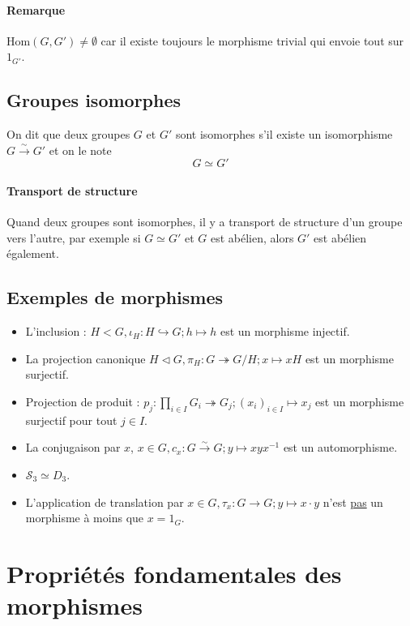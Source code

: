\documentclass[a4paper,10pt]{report}
\newcommand{\inj}{\hookrightarrow}
\newcommand{\surj}{\twoheadrightarrow}
\newcommand{\bij}{\overset{\sim}{\to}} %
\begin{document}
    \paragraph{Remarque}
    $\text{Hom}(G,G') \neq \emptyset$ car il existe toujours le morphisme trivial
    qui envoie tout sur $1_{G'}$.

   \subsection{Groupes isomorphes}
    On dit que deux groupes $G$ et $G'$ sont isomorphes s'il existe un
    isomorphisme $G \bij G'$ et on le note $$G \simeq G'$$

    \paragraph{Transport de structure} Quand deux groupes sont isomorphes,
    il y a transport de structure d'un groupe vers l'autre, par exemple si
    $G \simeq G'$ et $G$ est abélien, alors $G'$ est abélien également.

   \subsection{Exemples de morphismes}
    \begin{itemize}
     \item L'inclusion : $H < G, \iota_H : H \inj G; h \mapsto h$ est
       un morphisme injectif.
     \item La projection canonique $H \triangleleft G, \pi_H: G \surj G/H;
       x \mapsto xH$ est un morphisme surjectif.
     \item Projection de produit : $p_j : \displaystyle \prod_{i\in I}
       G_i \surj G_j ; (x_i)_{i \in I} \mapsto x_j$ est un morphisme
       surjectif pour tout $j \in I$.
     \item La conjugaison par $x$, $x \in G, c_x : G \bij G ; y \mapsto
       xyx^{-1}$ est un automorphisme.
     \item $\mathcal{S}_3 \simeq D_3$.  \item L'application de translation
       par $x \in G, \tau_x : G \to G; y \mapsto x\cdot y$ n'est
       \underline{pas} un morphisme à moins que $x= 1_G$.
    \end{itemize}

  \section{Propriétés fondamentales des morphismes}
\end{document}
